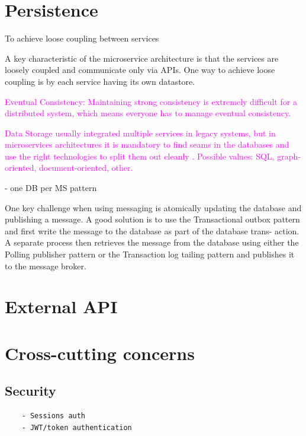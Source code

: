 \documentclass[thesis=M,english,hidelinks]{FITthesis}[2012/10/20]
\begin{document}
% 
% 
\section{Persistence}
\label{sec:persistence}

To achieve loose coupling between services 







A key characteristic of the microservice architecture is that the services are loosely coupled and communicate only via APIs. One way to achieve loose coupling is by each service having its own datastore.



\textcolor{magenta}{Eventual Consistency: Maintaining strong consistency is extremely difficult for a distributed system, which means everyone has to manage eventual consistency.}

\textcolor{magenta}{Data Storage usually integrated multiple services in legacy systems, but in microservices architectures it is mandatory to find seams in the databases and use the right technologies to split them out cleanly \cite{ms-building-ms}. Possible values: SQL, graph-oriented, document-oriented, other.}

- one DB per MS pattern 

One key challenge when using messaging is atomically updating the database and publishing a message. A good solution is to use the Transactional outbox pattern and first write the message to the database as part of the database trans- action. A separate process then retrieves the message from the database using either the Polling publisher pattern or the Transaction log tailing pattern and publishes it to the message broker.
% 
% 
\section{External API}
\label{sec:ext_api}


% 
%
\section{Cross-cutting concerns}
\subsection{Security}
\begin{verbatim}
    - Sessions auth
    - JWT/token authentication
\end{verbatim}
\end{document}
